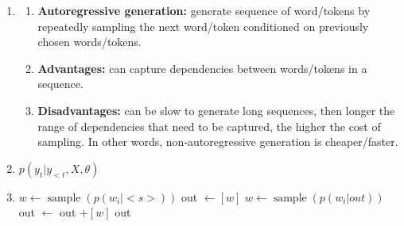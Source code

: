 \documentclass[11pt,a4paper]{article}
\begin{document}
\begin{enumerate}[label=(\alph*)]
    \item
          \begin{enumerate}[label=(\roman*)]
              \item \textbf{Autoregressive generation:} generate sequence of
                    word/tokens by repeatedly sampling the next word/token
                    conditioned on previously chosen words/tokens.
              \item \textbf{Advantages:} can capture dependencies between
                    words/tokens in a sequence.
              \item \textbf{Disadvantages:} can be slow to generate long
                    sequences, then longer the range of dependencies that need
                    to be captured, the higher the cost of sampling.
                    In other words, non-autoregressive generation is
                    cheaper/faster.
          \end{enumerate}
    \item $p(y_t|y_{<t},X,\theta)$
    \item
          \begin{algorithmic}
              \STATE $w \leftarrow \operatorname{sample}(p(w_i|<s>))$
              \STATE out $\leftarrow [w]$
              \STATE $w \leftarrow \operatorname{sample}(p(w_i|out))$
              \STATE out $\leftarrow$ out $+ [w]$
              \ENDWHILE
              \RETURN out
          \end{algorithmic}


\end{enumerate}
\end{document}
